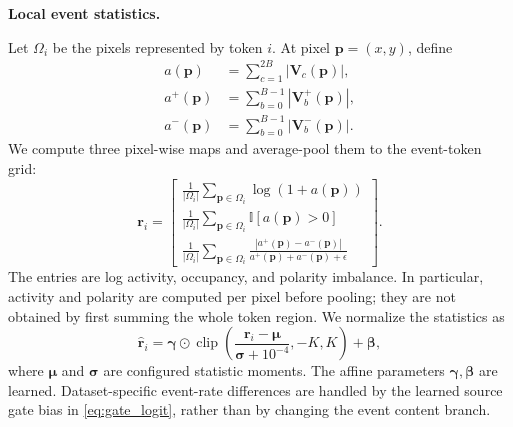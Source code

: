 \vspace{+5pt}
\noindent\textbf{Local event statistics.}

Let $\Omega_i$ be the pixels represented by token $i$.  At pixel
$\mathbf{p}=(x,y)$, define
\begin{align}
a(\mathbf{p})
&=\sum_{c=1}^{2B}|\mathbf{V}_{c}(\mathbf{p})|, \\
a^{+}(\mathbf{p})
&=\sum_{b=0}^{B-1}|\mathbf{V}^{+}_{b}(\mathbf{p})|, \\
a^{-}(\mathbf{p})
&=\sum_{b=0}^{B-1}|\mathbf{V}^{-}_{b}(\mathbf{p})|.
\end{align}
We compute three pixel-wise maps and average-pool them to the event-token grid:
\begin{equation}
\mathbf{r}_{i}=
\begin{bmatrix}
\displaystyle
\frac{1}{|\Omega_i|}
\sum_{\mathbf{p}\in\Omega_i}\log(1+a(\mathbf{p})) \\[8pt]
\displaystyle
\frac{1}{|\Omega_i|}
\sum_{\mathbf{p}\in\Omega_i}\mathbb{I}[a(\mathbf{p})>0] \\[8pt]
\displaystyle
\frac{1}{|\Omega_i|}
\sum_{\mathbf{p}\in\Omega_i}
\frac{|a^{+}(\mathbf{p})-a^{-}(\mathbf{p})|}
{a^{+}(\mathbf{p})+a^{-}(\mathbf{p})+\epsilon}
\end{bmatrix}.
\label{eq:reliability_statistics}
\end{equation}
The entries are log activity, occupancy, and polarity imbalance.  In
particular, activity and polarity are computed per pixel before pooling; they
are not obtained by first summing the whole token region.  We normalize the
statistics as
\begin{equation}
\hat{\mathbf{r}}_i
=\boldsymbol{\gamma}\odot
\operatorname{clip}\!\left(
\frac{\mathbf{r}_i-\boldsymbol{\mu}}
{\boldsymbol{\sigma}+10^{-4}},-K,K
\right)+\boldsymbol{\beta},
\label{eq:event_stat_normalization}
\end{equation}
where $\boldsymbol{\mu}$ and $\boldsymbol{\sigma}$ are configured statistic
moments.  The affine parameters $\boldsymbol{\gamma},\boldsymbol{\beta}$ are
learned.  Dataset-specific event-rate differences are handled by the learned
source gate bias in \cref{eq:gate_logit}, rather than by changing the event
content branch.

